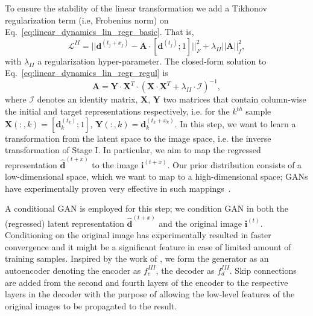 \documentclass[10pt,twocolumn,letterpaper]{article}
\begin{document}
To ensure the stability of the linear transformation we add a Tikhonov regularization term (i.e, Frobenius norm)  on Eq.~\ref{eq:linear_dynamics_lin_regr_basic}. That is,
\begin{equation}
    \mathcal{L}^{II} = ||\bm{d}^{(t_j + x_j)} - \bm{A}\cdot[\bm{d}^{(t_j)}; 1]||_F^2 + \lambda_{II} ||\bm{A}||_f^2,
    \label{eq:linear_dynamics_lin_regr_regul}
\end{equation}%
with $\lambda_{II}$ a regularization hyper-parameter. The closed-form solution to Eq.~\ref{eq:linear_dynamics_lin_regr_regul} is 
\begin{equation}
    \bm{A} = \bm{Y} \cdot \bm{X}^T \cdot (\bm{X}\cdot\bm{X}^T + \lambda_{II} \cdot \bm{\mathcal{I}})^{-1},
    \label{eq:linear_dynamics_lin_regr_solution_a}
\end{equation}%
where $\bm{\mathcal{I}}$ denotes an identity matrix, $\bm{X}$, $\bm{Y}$ two matrices that contain column-wise the initial and target representations respectively, i.e. for the $k^{th}$ sample  $\bm{X}(:, k) = [\bm{d}_k^{(t_k)}; 1]$, $\bm{Y}(:, k) = \bm{d}_k^{(t_k + x_k)}$.
In this step, we want to learn a transformation from the latent space to the image space, i.e. the inverse transformation of Stage I. In particular, we aim to map the regressed representation $\hat{\bm{d}}^{(t + x)}$ to the image $\bm{i}^{(t + x)}$. Our prior distribution consists of a low-dimensional space, which we want to map to a high-dimensional space; GANs have experimentally proven very effective in such mappings~\cite{ledig2016photo, pathak2016context}. 

A conditional GAN is employed for this step; we condition GAN in both the (regressed) latent representation $\hat{\bm{d}}^{(t + x)}$ and the original image $\bm{i}^{(t)}$. Conditioning on the original image has experimentally resulted in faster convergence and it might be a significant feature in case of limited amount of training samples. Inspired by the work of \cite{isola2016image}, we form the generator as an autoencoder denoting the encoder as $f_e^{III}$, the decoder as $f_d^{III}$. Skip connections are added from the second and fourth layers of the encoder to the respective layers in the decoder with the purpose of allowing the low-level features of the original images to be propagated to the result. 
\end{document}
